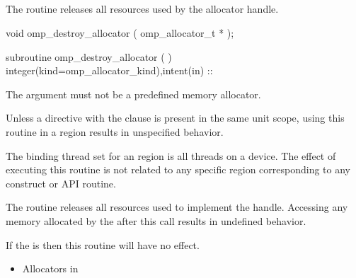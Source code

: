 \subsection{}
\label{subsec:omp_destroy_allocator}

\summary
The  routine releases all resources used by the allocator handle.

\format
\begin{ccppspecific}
\begin{ompcFunction}
void omp_destroy_allocator ( omp_allocator_t * );
\end{ompcFunction}
\end{ccppspecific}
\begin{fortranspecific}
\begin{ompfSubroutine}
subroutine omp_destroy_allocator (  )
integer(kind=omp_allocator_kind),intent(in) :: 
\end{ompfSubroutine}
\end{fortranspecific}

\constraints

The  argument must not be a predefined memory allocator.

Unless a  directive with the  clause is present in the same unit scope, using this routine in a  region results in unspecified behavior.

\binding

The binding thread set for an  region is all threads on a device.
The effect of executing this routine is not related to any specific region corresponding to any construct or API routine.

\effect

The  routine releases all resources used to implement the  handle. Accessing any memory allocated by the  after this call results in undefined behavior.

If the  is  then this routine will have no effect.
 
\crossreferences
\begin{itemize}
\item Allocators in 
\end{itemize}


